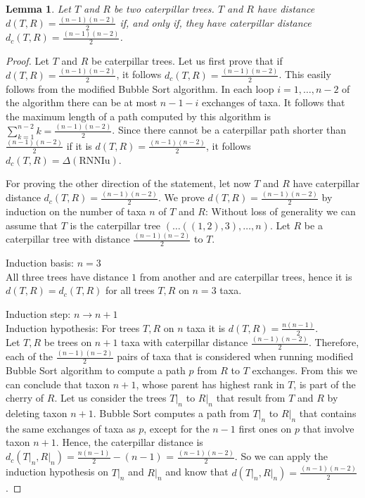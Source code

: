 \documentclass{amsart}
\newcommand{\rnniu}{\mathrm{RNNIu}}
\newtheorem{lemma}[definition]{Lemma}
\begin{document}
\begin{lemma}
    Let $T$ and $R$ be two caterpillar trees.
    $T$ and $R$ have distance $d(T,R) = \frac{(n-1)(n-2)}{2}$ if, and only if, they have caterpillar distance $d_c(T,R) = \frac{(n-1)(n-2)}{2}$.
    \label{lemma:caterpillar_dist=diameter}
\end{lemma}

\begin{proof}
    Let $T$ and $R$ be caterpillar trees.
    Let us first prove that if $d(T,R) = \frac{(n-1)(n-2)}{2}$, it follows $d_c(T,R) = \frac{(n-1)(n-2)}{2}$.
    This easily follows from the modified Bubble Sort algorithm. 
    In each loop $i=1, \ldots, n-2$ of the algorithm there can be at most $n-1-i$ exchanges of taxa.
    It follows that the maximum length of a path computed by this algorithm is $\sum\limits_{k=1}^{n-2} k = \frac{(n-1)(n-2)}{2}$.
    Since there cannot be a caterpillar path shorter than $\frac{(n-1)(n-2)}{2}$ if it is $d(T,R) = \frac{(n-1)(n-2)}{2}$, it follows $d_c(T,R) = \Delta(\rnniu)$.

    For proving the other direction of the statement, let now $T$ and $R$ have caterpillar distance $d_c(T,R) =  \frac{(n-1)(n-2)}{2}$.
    We prove $d(T,R) = \frac{(n-1)(n-2)}{2}$ by induction on the number of taxa $n$ of $T$ and $R$:
    Without loss of generality we can assume that $T$ is the caterpillar tree $(\ldots ((1,2),3), \ldots, n)$.
    Let $R$ be a caterpillar tree with distance $\frac{(n-1)(n-2)}{2}$ to $T$.

    Induction basis: $n=3$\\
    All three trees have distance $1$ from another and are caterpillar trees, hence it is $d(T,R) = d_c(T,R)$ for all trees $T,R$ on $n=3$ taxa.

    Induction step: $n \to n+1$\\
    Induction hypothesis: For trees $T, R$ on $n$ taxa it is $d(T, R) = \frac{n(n-1)}{2}$.\\
    Let $T, R$ be trees on $n+1$ taxa with caterpillar distance $\frac{(n-1)(n-2)}{2}$.
    Therefore, each of the $\frac{(n-1)(n-2)}{2}$ pairs of taxa that is considered when running modified Bubble Sort algorithm  to compute a path $p$ from $R$ to $T$ exchanges.
    From this we can conclude that taxon $n+1$, whose parent has highest rank in $T$, is part of the cherry of $R$.
    Let us consider the trees $T{\big|}_n$ to $R{\big|}_n$ that result from $T$ and $R$ by deleting taxon $n+1$.
    Bubble Sort  computes a path from $T{\big|}_n$ to $R{\big|}_n$ that contains the same exchanges of taxa as $p$, except for the $n-1$ first ones on $p$ that involve taxon $n+1$.
    Hence, the caterpillar distance is $d_c(T{\big|}_n, R{\big|}_n) = \frac{n(n-1)}{2} - (n-1)$ = $\frac{(n-1)(n-2)}{2}$.
    So we can apply the induction hypothesis on $T{\big|}_n$ and $R{\big|}_n$ and know that $d(T{\big|}_n,R{\big|}_n) = \frac{(n-1)(n-2)}{2}$.


\end{proof}
\end{document}
